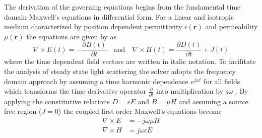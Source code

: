 The derivation of the governing equations begins from the fundamental time domain Maxwell's equations in differential form. For a linear and isotropic medium characterized by position dependent permittivity $\epsilon(\bm{r})$ and permeability $\mu(\bm{r})$ the equations are given by \citet{Jin2015} as
\begin{equation}
\nabla \times E(t) = -\frac{\partial B(t)}{\partial t} \quad \text{and} \quad \nabla \times H(t) = \frac{\partial D(t)}{\partial t} + J(t)
\end{equation}
where the time dependent field vectors are written in italic notation. To facilitate the analysis of steady state light scattering the solver adopts the frequency domain approach by assuming a time harmonic dependence $e^{j\omega t}$ for all fields which transforms the time derivative operator $\frac{\partial}{\partial t}$ into multiplication by $j\omega$ \citep{Monk1992}. By applying the constitutive relations $D=\epsilon E$ and $B=\mu H$ and assuming a source free region ($J=0$) the coupled first order Maxwell's equations become
\begin{align}
\nabla \times E &= -j\omega\mu H \\
\nabla \times H &= j\omega\epsilon E
\end{align}

